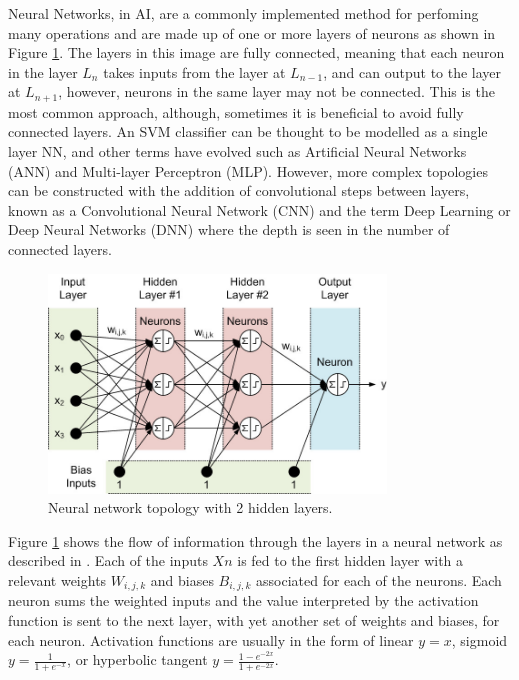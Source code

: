 \documentclass[fleqn,twoside]{article}
\begin{document}
Neural Networks, in AI, are a commonly implemented method for perfoming many operations and are made up of one or more layers of neurons as shown in Figure \ref{fig:neural_net}. The layers in this image are fully connected, meaning that each neuron in the layer $L_n$ takes inputs from the layer at $L_{n-1}$, and can output to the layer at $L_{n+1}$, however, neurons in the same layer may not be connected. This is the most common approach, although, sometimes it is beneficial to avoid fully connected layers. An SVM classifier can be thought to be modelled as a single layer NN, and other terms have evolved such as Artificial Neural Networks (ANN) and Multi-layer Perceptron (MLP). However, more complex topologies can be constructed with the addition of convolutional steps between layers, known as a Convolutional Neural Network (CNN) and the term Deep Learning or Deep Neural Networks (DNN) where the depth is seen in the number of connected layers.  

\begin{figure}[h]
	\centering
	\includegraphics[width=0.8\textwidth]{neural_net.jpeg}
	\caption{Neural network topology with 2 hidden layers.}
	\label{fig:neural_net}
\end{figure}

Figure \ref{fig:neural_net} shows the flow of information through the layers in a neural network as described in \cite{smith}. Each of the inputs $Xn$ is fed to the first hidden layer with a relevant weights $W_{i,j,k}$ and biases $B_{i,j,k}$ associated for each of the neurons. Each neuron sums the weighted inputs and the value interpreted by the activation function is sent to the next layer, with yet another set of weights and biases, for each neuron. Activation functions are usually in the form of linear $y=x$, sigmoid $y=\frac{1}{1+e^{-x}}$, or hyperbolic tangent $y=\frac{1-e^{-2x}}{1+e^{-2x}}$.
\end{document}
